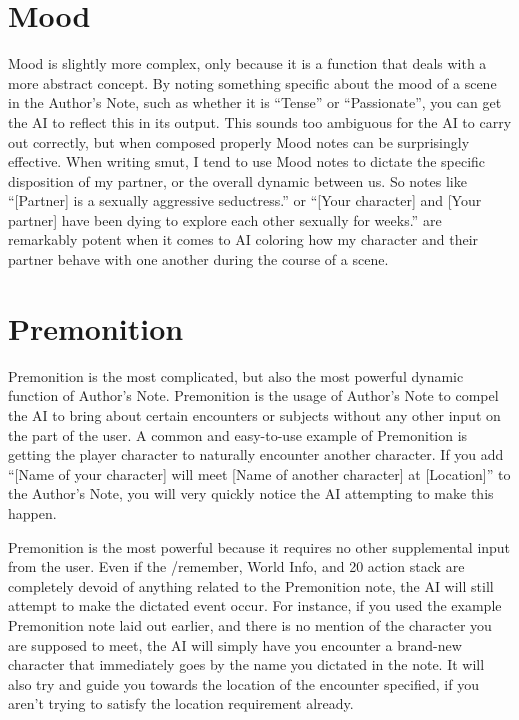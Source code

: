 \documentclass[Source-main.tex]{subfiles}
\begin{document}
\section{Mood}

Mood is slightly more complex, only because it is a function that deals with a more abstract concept.
By noting something specific about the mood of a scene in the Author’s Note, such as whether it is “Tense” or “Passionate”, you can get the AI to reflect this in its output.
This sounds too ambiguous for the AI to carry out correctly, but when composed properly Mood notes can be surprisingly effective.
When writing smut, I tend to use Mood notes to dictate the specific disposition of my partner, or the overall dynamic between us.
So notes like “[Partner] is a sexually aggressive seductress.” or “[Your character] and [Your partner] have been dying to explore each other sexually for weeks.” are remarkably potent when it comes to AI coloring how my character and their partner behave with one another during the course of a scene.

\section{Premonition}

Premonition is the most complicated, but also the most powerful dynamic function of Author’s Note.
Premonition is the usage of Author’s Note to compel the AI to bring about certain encounters or subjects without any other input on the part of the user.
A common and easy-to-use example of Premonition is getting the player character to naturally encounter another character.
If you add “[Name of your character] will meet [Name of another character] at [Location]” to the Author’s Note, you will very quickly notice the AI attempting to make this happen.

Premonition is the most powerful because it requires no other supplemental input from the user.
Even if the /remember, World Info, and 20 action stack are completely devoid of anything related to the Premonition note, the AI will still attempt to make the dictated event occur.
For instance, if you used the example Premonition note laid out earlier, and there is no mention of the character you are supposed to meet, the AI will simply have you encounter a brand-new character that immediately goes by the name you dictated in the note.
It will also try and guide you towards the location of the encounter specified, if you aren’t trying to satisfy the location requirement already.
\end{document}
